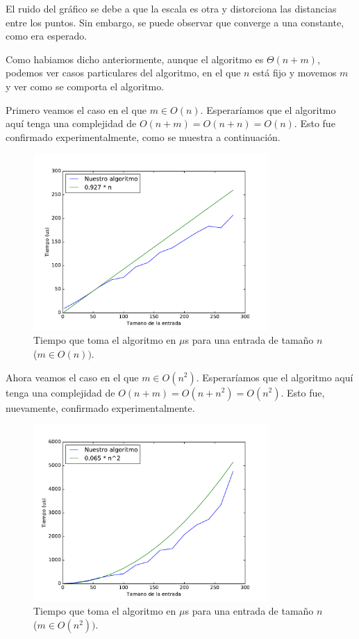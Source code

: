 El ruido del gráfico se debe a que la escala es otra y distorciona las distancias entre los puntos. Sin embargo, se puede observar que converge a una constante, como era esperado.


Como habiamos dicho anteriormente, aunque el algoritmo es $\Theta(n + m)$, podemos ver casos particulares del algoritmo, en el que $n$ está fijo y movemos $m$ y ver como se comporta el algoritmo.

Primero veamos el caso en el que $m \in O(n)$. Esperaríamos que el algoritmo aquí tenga una complejidad de $O(n + m) = O(n + n) = O(n)$. Esto fue confirmado experimentalmente, como se muestra a continuación.

\begin{figure}[H]
 \centering
	\includegraphics[width=0.8\textwidth]{img/exp/problema1-mejor.pdf}
	\caption{\footnotesize Tiempo que toma el algoritmo en $\mu$s para una entrada de tamaño $n$ ($m \in O(n))$.}
	\label{fig:problema1-mejor}
\end{figure}


Ahora veamos el caso en el que $m \in O(n^2)$. Esperaríamos que el algoritmo aquí tenga una complejidad de $O(n + m) = O(n + n^2) = O(n^2)$. Esto fue, nuevamente, confirmado experimentalmente.

\begin{figure}[H]
 \centering
	\includegraphics[width=0.8\textwidth]{img/exp/problema1-peor.pdf}
	\caption{\footnotesize Tiempo que toma el algoritmo en $\mu$s para una entrada de tamaño $n$ ($m \in O(n^2))$.}
	\label{fig:problema1-peor}
\end{figure}


